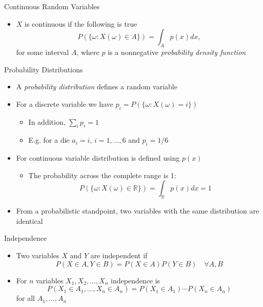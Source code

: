 \documentclass{beamer}
\begin{document}
\begin{frame}{Continuous Random Variables} 
\begin{itemize} 
 \item $X$ is continuous if the following is true 
\begin{displaymath} 
P(\{\omega: X(\omega) \in A\}) = \int_{A} p(x) dx, 
\end{displaymath}
for some interval $A$, where $p$ is a nonnegative \emph{probability density function} 
\end{itemize}
\end{frame}

\begin{frame}{Probability Distributions} 
\begin{itemize}
\item A \emph{probability distribution} defines a random variable 
\item For a discrete variable we have $p_i = P(\{\omega: X(\omega) = i\})$
\begin{itemize}
\item In addition, $\sum_i p_i  = 1$
\item E.g. for a die $a_i = i$, $i=1,\ldots, 6$ and $p_i = 1/6$
\end{itemize}
\item For continuous variable distribution is defined using $p(x)$
\begin{itemize}
\item The probability across the complete range is 1: 
\begin{displaymath}
P(\{\omega: X(\omega) \in \mathbb{R}\}) = \int_\mathbb{R} p(x) dx = 1
\end{displaymath} 
\end{itemize}
\item From a probabilistic standpoint, two variables with the same distribution are identical 
\end{itemize}
\end{frame}

\begin{frame}{Independence}  
\begin{itemize} 
 \item Two variables $X$ and $Y$ are independent if 
 \begin{displaymath} 
  P(X \in A, Y \in B) = P(X \in A)P(Y \in B) \quad \forall A, B
 \end{displaymath}
\item For $n$ variables $X_1, X_2, \ldots, X_n$ independence is 
 \begin{displaymath} 
  P(X_1 \in A_1, \ldots, X_n \in A_n) = P(X_1 \in A_1) \cdots P(X_n \in A_n)
 \end{displaymath}
 for all $A_1, \ldots, A_n$ 
\end{itemize}
\end{frame}
\end{document}
